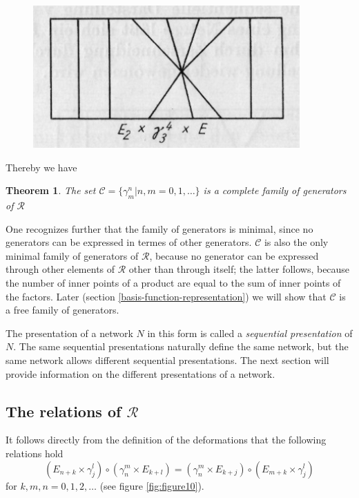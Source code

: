 \documentclass{article}
\newtheorem{theorem}{Theorem}
\begin{document}
\begin{figure}
\includegraphics[]{figure9.png}
\caption{}
\label{fig:figure9}
\end{figure}

Thereby we have

\begin{theorem}
The set $\mathcal{C} = \{ \gamma_m^n | n, m = 0, 1, \ldots \}$ is a complete family of generators of $\mathcal{R}$
\end{theorem}

One recognizes further that the family of generators is minimal, since no generators can be expressed in termes of other generators. $\mathcal{C}$ is also the only minimal family of generators of $\mathcal{R}$, because no generator can be expressed through other elements of $\mathcal{R}$ other than through itself; the latter follows, because the number of inner points of a product are equal to the sum of inner points of the factors. Later (section \ref{basis-function-representation}) we will show that $\mathcal{C}$ is
a free family of generators.

The presentation of a network $N$ in this form is called a \emph{sequential presentation} of $N$. The same sequential presentations naturally define the same network, but the same network allows different sequential presentations. The next section will provide information on the different presentations of a network.

\subsection{The relations of $\mathcal{R}$}

It follows directly from the definition of the deformations that the following relations hold
\begin{equation}
\label{eq:R1}
\tag{R1}
(E_{n+k} \times \gamma_j^l) \circ (\gamma_n^m \times E_{k + l}) = (\gamma_n^m \times E_{k+j}) \circ (E_{m+k} \times \gamma_j^l) 
\end{equation}
for $k, m, n = 0, 1, 2, \ldots$ (see figure \ref{fig:figure10}).
\end{document}
